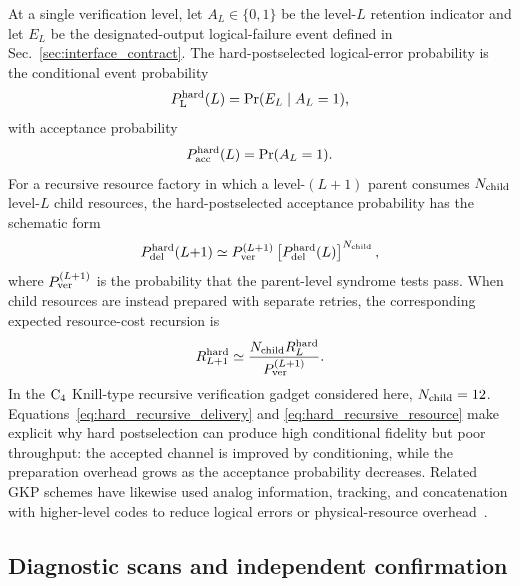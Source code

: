 \documentclass[aps,
prx,
superscriptaddress,
reprint,
longbibliography,
floatfix]{revtex4-2}
\newcommand{\Pacc}{P_{\mathrm{acc}}}
\newcommand{\Plog}{P_{\mathrm{L}}}
\begin{document}
At a single verification level, let $A_L\in\{0,1\}$ be the level-$L$ retention indicator and let $E_L$ be the designated-output logical-failure event defined in Sec.~\ref{sec:interface_contract}. The hard-postselected logical-error probability is the conditional event probability
\begin{equation}
\Plog^{\rm hard}(L)=\Pr(E_L\mid A_L=1),
\label{eq:hard_conditional_channel}
\end{equation}
with acceptance probability
\begin{equation}
\Pacc^{\rm hard}(L)=\Pr(A_L=1).
\end{equation}
For a recursive resource factory in which a level-$(L{+}1)$ parent consumes $N_{\rm child}$ level-$L$ child resources, the hard-postselected acceptance probability has the schematic form
\begin{equation}
P_{\rm del}^{\rm hard}(L{+}1)
\simeq
P_{\rm ver}^{(L+1)}
\left[P_{\rm del}^{\rm hard}(L)\right]^{N_{\rm child}},
\label{eq:hard_recursive_delivery}
\end{equation}
where $P_{\rm ver}^{(L+1)}$ is the probability that the parent-level syndrome tests pass. When child resources are instead prepared with separate retries, the corresponding expected resource-cost recursion is
\begin{equation}
R_{L+1}^{\rm hard}
\simeq
\frac{N_{\rm child}R_L^{\rm hard}}{P_{\rm ver}^{(L+1)}}.
\label{eq:hard_recursive_resource}
\end{equation}
In the ${\rm C_4}$ Knill-type recursive verification gadget considered here, $N_{\rm child}=12$. Equations~\eqref{eq:hard_recursive_delivery} and \eqref{eq:hard_recursive_resource} make explicit why hard postselection can produce high conditional fidelity but poor throughput: the accepted channel is improved by conditioning, while the preparation overhead grows as the acceptance probability decreases. Related GKP schemes have likewise used analog information, tracking, and concatenation with higher-level codes to reduce logical errors or physical-resource overhead~\cite{Fukui2018TrackingQEC,FukuiMatsuuraMenicucci2023Concatenated}.



\subsection{Diagnostic scans and independent confirmation}\label{app:qualification_diagnostics}
\end{document}
